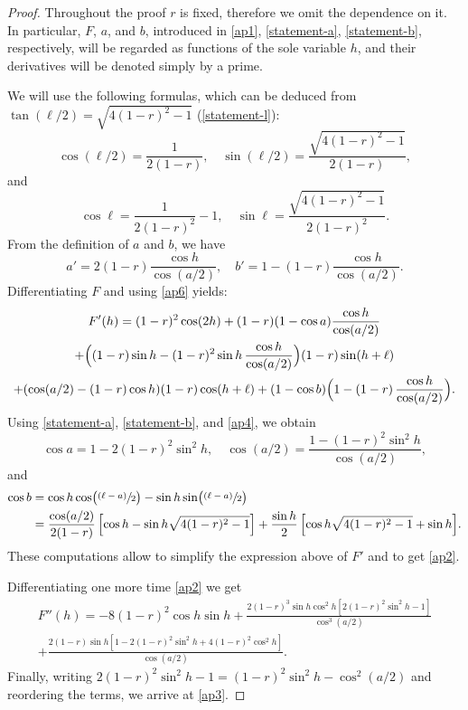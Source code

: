 \documentclass[JEP,XML,SOM,Unicode,NoFloatCountersInSection]{cedram}
\newcommand{\psfrac}[2]{\sfrac{(#1)}{#2}}
\theoremstyle{plain}
\theoremstyle{definition}
\begin{document}
\begin{proof}
Throughout the proof $r$ is fixed, therefore we omit the dependence on it. In particular, $F$, $a$, and $b$, introduced in \eqref{ap1}, \eqref{statement-a}, \eqref{statement-b}, respectively, will be regarded as functions of the sole variable $h$, and their derivatives will be denoted simply by a prime.

We will use the following formulas, which can be deduced from $\tan(\ell/2)=\sqrt{4(1-r)^2-1}$ (\cf \eqref{statement-l}):
\begin{equation}\label{ap4}
\cos(\ell/2)=\frac{1}{2(1-r)}, \quad \sin(\ell/2)=\frac{\sqrt{4(1-r)^2-1}}{2(1-r)},
\end{equation}
and
\begin{equation}\label{ap5}
\cos\ell=\frac{1}{2(1-r)^2} - 1,\quad \sin\ell=\frac{\sqrt{4(1-r)^2-1}}{2(1-r)^2}.
\end{equation}
From the definition of $a$ and $b$, we have
\begin{equation}\label{ap6}
a'=2(1-r) \frac{\cos h}{\cos(a/2)},\quad
b'=1 - (1-r) \frac{\cos h}{\cos(a/2)}.
\end{equation}
Differentiating $F$ and using \eqref{ap6} yields:
\begin{multline*}
F'(h)=(1-r)^2 \cos(2h) +(1-r) (1-\cos a)\frac{\cos h}{\cos(a/2)}\\
+\Bigl((1-r)\sin h-(1-r)^2 \sin h\, \frac{\cos h}{\cos(a/2)}\Bigr) (1-r) \sin(h+\ell)\\
+(\cos(a/2)-(1-r)\cos h) (1-r) \cos(h+\ell) +(1-\cos b) \Bigl(1-(1-r)\, \frac{\cos h}{\cos(a/2)}\Bigr).
\end{multline*}
Using \eqref{statement-a}, \eqref{statement-b}, and \eqref{ap4}, we obtain
\[
\cos a= 1- 2(1-r)^2\sin^2 h,\quad \cos(a/2)=\frac{1-(1-r)^2\sin^2 h}{\cos(a/2)},
\]
and
\begin{align*}
\cos b&=\cos h \cos\bigl(\psfrac{\ell-a}{2}\bigr)-\sin h \sin\bigl(\psfrac{\ell -a}{2}\bigr)\\
&=\frac{\cos(a/2)}{2(1-r)}\,\Bigl[\cos h-\sin h \sqrt{4(1-r)^2-1} \Bigr]+
\frac{\sin h}{2}\,\Bigl[\cos h \sqrt{4(1-r)^2-1}
+ \sin h\Bigr].
\end{align*}
These computations allow to simplify the expression above of $F'$ and to get \eqref{ap2}.

Differentiating one more time \eqref{ap2} we get
\begin{multline*}
F''(h)=-8 (1-r)^2 \cos h \sin h + \frac{2(1-r)^3 \sin h \cos^2 h \left[ 2(1-r)^2 \sin^2 h - 1\right]}{\cos^3(a/2)}
\\
+\frac{2 (1-r)\sin h\left[ 1-2(1-r)^2\sin^2 h + 4 (1-r)^2 \cos^2 h \right]}{\cos(a/2)}.
\end{multline*}
Finally, writing $2(1-r)^2\sin^2h - 1 = (1-r)^2\sin^2 h - \cos^2(a/2)$ and reordering the terms, we arrive at \eqref{ap3}.


\end{proof}
\end{document}
